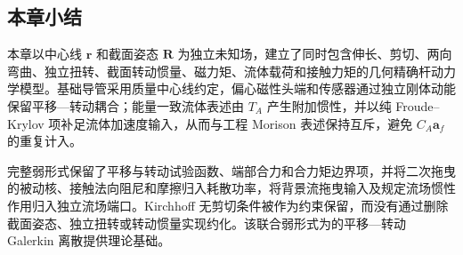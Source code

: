 \subsection{本章小结}\label{sec:rod-1-8}

本章以中心线 \(\mathbf{r}\) 和截面姿态 \(\mathbf{R}\) 为独立未知场，建立了同时包含伸长、剪切、两向弯曲、独立扭转、截面转动惯量、磁力矩、流体载荷和接触力矩的几何精确杆动力学模型。基础导管采用质量中心线约定，偏心磁性头端和传感器通过独立刚体动能保留平移---转动耦合；能量一致流体表述由 \(T_{A}\) 产生附加惯性，并以纯 Froude--Krylov 项补足流体加速度输入，从而与工程 Morison 表述保持互斥，避免 \(C_{A}\mathbf{a}_{f}\) 的重复计入。

完整弱形式保留了平移与转动试验函数、端部合力和合力矩边界项，并将二次拖曳的被动核、接触法向阻尼和摩擦归入耗散功率，将背景流拖曳输入及规定流场惯性作用归入独立流场端口。Kirchhoff 无剪切条件被作为约束保留，而没有通过删除截面姿态、独立扭转或转动惯量实现约化。该联合弱形式为的平移---转动 Galerkin 离散提供理论基础。
